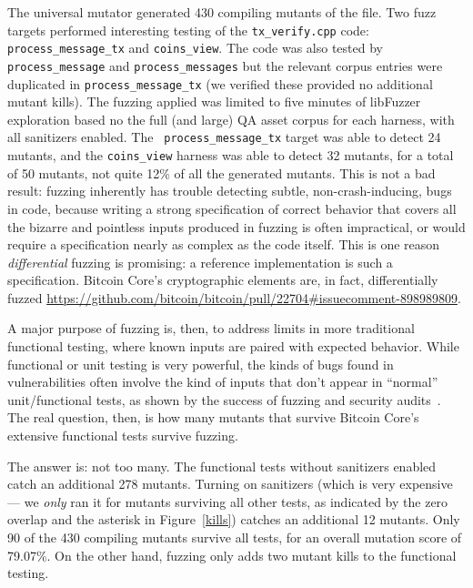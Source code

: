 \begin{sloppypar}
The universal mutator generated 430 compiling mutants of the file.
Two fuzz targets performed interesting testing of the {\tt tx\_verify.cpp} code:
{\tt process\_message\_tx} and {\tt coins\_view}.  The code was also
tested by {\tt process\_message} and {\tt process\_messages} but the
relevant corpus entries were duplicated in {\tt process\_message\_tx}
(we verified these provided no additional mutant kills).  The fuzzing
applied was limited to five minutes of libFuzzer exploration based no
the full (and large) QA asset corpus for each harness, with all
sanitizers enabled.  The {\tt
  process\_message\_tx} target was able to detect 24 mutants, and the
{\tt coins\_view} harness was able to detect 32 mutants, for a total
of 50 mutants, not quite 12\% of all the generated mutants.  This is
not a bad result: fuzzing inherently has trouble detecting subtle,
non-crash-inducing, bugs in code, because writing a strong specification of
correct behavior that covers all the bizarre and pointless inputs
produced in fuzzing is often impractical, or would require a
specification nearly as complex as the code itself.  This is one
reason \emph{differential} fuzzing is promising: a reference
implementation is such a specification.  Bitcoin Core's cryptographic
elements are, in fact, differentially fuzzed
\url{https://github.com/bitcoin/bitcoin/pull/22704#issuecomment-898989809}.
\end{sloppypar}


A major purpose of fuzzing is, then, to address limits in more
traditional functional testing, where known inputs are paired with
expected behavior.  While functional or unit testing is very powerful,
the kinds of bugs found in vulnerabilities often involve the kind of
inputs that don't appear in ``normal'' unit/functional tests, as shown
by the success of fuzzing and security audits~\cite{FC20}.  The real
question, then, is how many mutants that survive Bitcoin Core's
extensive functional tests survive fuzzing.

The answer is: not too many.  The functional tests without sanitizers
enabled catch an additional 278 mutants.  Turning on sanitizers (which
is very expensive --- we \emph{only} ran it for mutants surviving all other
tests, as indicated by the zero overlap and the asterisk in Figure~\ref{kills}) catches an additional 12 mutants.  Only 90 of the
430 compiling mutants survive all tests, for an overall mutation score
of 79.07\%.  On the other hand, fuzzing only adds two mutant kills to
the functional testing.

